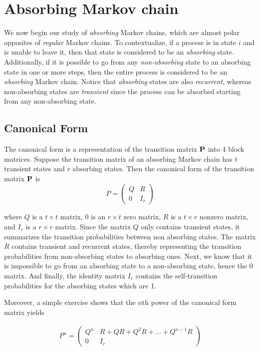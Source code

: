 \documentclass[a4paper,12pt]{article}
\theoremstyle{definition}
\let\oldtextbf\mathbf
\renewcommand{\mathbf}[1]{\oldtextbf{\boldmath #1}}
\begin{document}
\section{Absorbing Markov chain}

	We now begin our study of \emph{absorbing} Markov chains, which are almost polar opposites of \emph{regular} Markov chains. 
	To contextualize, if a process is in state $i$ and is unable to leave it, then that state is considered to be an \emph{absorbing} 
	state. Additionally, if it is possible to go from any \emph{non-absorbing} state to an absorbing state in one or more steps, then 
	the entire process is considered to be an \emph{absorbing} Markov chain. Notice that \emph{absorbing} states are also 
	\emph{recurrent}, whereas non-absorbing states are \emph{transient} since the process can be absorbed starting from any 
	non-absorbing state.	
	
	\subsection*{Canonical Form}
	
	The canonical form is a representation of the transition matrix $\mathbf{P}$ into 4 block matrices. Suppose the transition matrix 
	of an absorbing Markov chain has $t$ transient states and $r$ absorbing states. Then the canonical form of the 
	transition matrix $\mathbf{P}$ is
	 \[
    P = \left(
    \begin{array}{c|c}
      Q & R\\
      \hline
      0 & I_r
    \end{array}
    \right)
  \]
  
	where $Q$ is a $t \times t$ matrix, $0$ is an $r \times t$ zero matrix, $R$ is a $t \times r$ nonzero matrix, and $I_r$ is a 
	$r \times r$ matrix. Since the matrix $Q$ only contains transient states, it summarizes the transition probabilities 
	between non absorbing states. The matrix $R$ contains transient and recurrent states, thereby representing the transition 
	probabilities from non-absorbing states to absorbing ones. Next, we know that it is impossible to go from an absorbing state 
	to a non-absorbing state, hence the $0$ matrix. And finally, the identity matrix $I_r$ contains the self-transition 
	probabilities for the absorbing states which are 1.

Moreover, a simple exercise shows that the $n$th power of the canonical form matrix yields

	\begin{equation*}
	\begin{aligned}
		P^n = \left(
		\begin{array}{c|c}
		Q^n & R + QR + Q^2R + ... + Q^{n-1}R\\
		\hline
		0 & I_r
		\end{array}
    	\right)
	\end{aligned}
	\end{equation*}	
\end{document}
